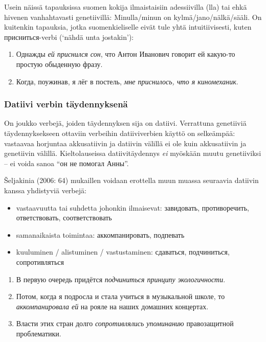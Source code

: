 \documentclass[]{scrartcl}
\providecommand{\tightlist}{%
  \setlength{\itemsep}{0pt}\setlength{\parskip}{0pt}}
\begin{document}
Usein näissä tapauksissa suomen kokija ilmaistaisiin adessiivilla (lla)
tai ehkä hivenen vanhahtavasti genetiivillä: Minulla/minun on
kylmä/jano/nälkä/sääli. On kuitenkin tapauksia, jotka suomenkieliselle
eivät tule yhtä intuitiivisesti, kuten присниться-verbi (`nähdä unta
jostakin'):

\begin{enumerate}
\def\labelenumi{(\arabic{enumi})}
\setcounter{enumi}{18}
\tightlist
\item
  Однажды \emph{ей приснился сон}, что Антон Иванович говорит ей
  какую-то простую обыденную фразу.
\item
  Когда, поужинав, я лёг в постель, \emph{мне приснилось, что я
  киномеханик}.
\end{enumerate}

\subsubsection{Datiivi verbin
täydennyksenä}\label{datiivi-verbin-tuxe4ydennyksenuxe4}

On joukko verbejä, joiden täydennyksen sija on datiivi. Verrattuna
genetiiviä täydennyksekseen ottaviin verbeihin datiiviverbien käyttö on
selkeämpää: vastaavaa horjuntaa akkusatiivin ja datiivin välillä ei ole
kuin akkusatiivin ja genetiivin välillä. Kieltolauseissa
datiivitäydennys \emph{ei} myöskään muutu genetiiviksi -- ei voida sanoa
``он не помогал Анны''.

Šeljakinia (2006: 64) mukaillen voidaan erottella muun muassa seuraavia
datiivin kanssa yhdistyviä verbejä:

\begin{itemize}
\tightlist
\item
  vastaavuutta tai suhdetta johonkin ilmaisevat: завидовать,
  противоречить, ответствовать, соответствовать
\item
  samanaikaista toimintaa: аккомпанировать, подпевать
\item
  kuuluminen / alistuminen / vastustaminen: сдаваться, подчиниться,
  сопротивляться
\end{itemize}

\begin{enumerate}
\def\labelenumi{(\arabic{enumi})}
\setcounter{enumi}{20}
\tightlist
\item
  В первую очередь придётся \emph{подчиниться принципу экологичности}.
\item
  Потом, когда я подросла и стала учиться в музыкальной школе, то
  \emph{аккомпанировала ей} на рояле на наших домашних концертах.
\item
  Власти этих стран долго \emph{сопротивлялись упоминанию} правозащитной
  проблематики.
\end{enumerate}
\end{document}
